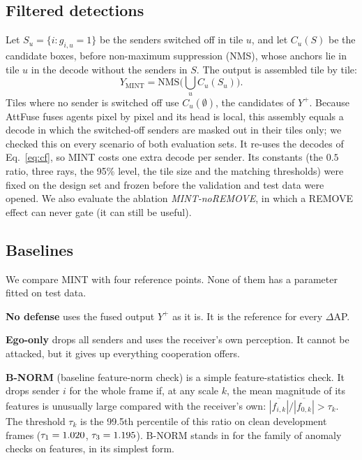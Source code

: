 \documentclass[conference]{IEEEtran}
\newcommand{\mint}{MINT}
\begin{document}
\subsection{Filtered detections}
\label{sec:compose}
Let $S_u=\{i: g_{i,u}=1\}$ be the senders switched off in tile $u$, and let $C_u(S)$ be the candidate boxes,
before non-maximum suppression (NMS), whose anchors lie in tile $u$ in the decode without the senders in $S$.
The output is assembled tile by tile:
\begin{equation}
Y_{\mathrm{MINT}}=\mathrm{NMS}\Big(\textstyle\bigcup_{u} C_u(S_u)\Big).
\label{eq:compose}
\end{equation}
Tiles where no sender is switched off use $C_u(\emptyset)$, the candidates of $Y^{+}$. Because AttFuse fuses
agents pixel by pixel and its head is local, this assembly equals a decode in which the switched-off senders are
masked out in their tiles only; we checked this on every scenario of both evaluation sets. It re-uses the decodes of
Eq.~\eqref{eq:cf}, so \mint{} costs one extra decode per sender. Its constants (the $0.5$ ratio, three rays, the
95\% level, the tile size and the matching thresholds) were fixed on the design set and frozen before the
validation and test data were opened. We also evaluate the ablation \emph{\mint-noREMOVE}, in which a REMOVE effect
can never gate (it can still be useful).

\subsection{Baselines}
\label{sec:baselines}
We compare \mint{} with four reference points. None of them has a parameter fitted on test data.

\textbf{No defense} uses the fused output $Y^{+}$ as it is. It is the reference for every $\Delta$AP.

\textbf{Ego-only} drops all senders and uses the receiver's own perception. It cannot be attacked, but it gives
up everything cooperation offers.

\textbf{B-NORM} (baseline feature-norm check) is a simple feature-statistics check. It drops sender $i$ for the whole frame if, at any scale
$k$, the mean magnitude of its features is unusually large compared with the receiver's own:
$\overline{|f_{i,k}|}/\overline{|f_{0,k}|}>\tau_k$. The threshold $\tau_k$ is the 99.5th percentile of this ratio
on clean development frames ($\tau_1=1.020$, $\tau_3=1.195$). B-NORM stands in for the family of
anomaly checks on features, in its simplest form.
\end{document}
